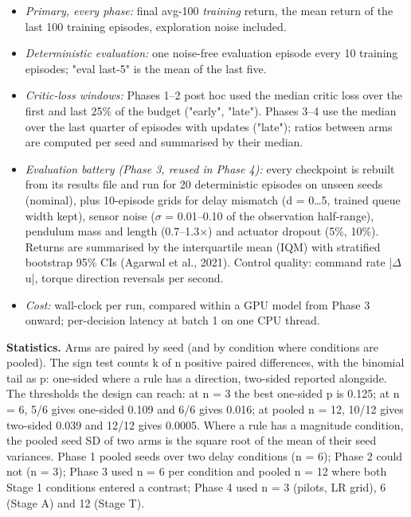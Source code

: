 \documentclass[11pt]{article}
\begin{document}
\begin{itemize}
\item \emph{Primary, every phase:} final avg-100 \emph{training} return, the mean return of the last 100 training episodes, exploration noise included.
\item \emph{Deterministic evaluation:} one noise-free evaluation episode every 10 training episodes; "eval last-5" is the mean of the last five.
\item \emph{Critic-loss windows:} Phases 1--2 post hoc used the median critic loss over the first and last 25\% of the budget ("early", "late"). Phases 3--4 use the median over the last quarter of episodes with updates ("late"); ratios between arms are computed per seed and summarised by their median.
\item \emph{Evaluation battery (Phase 3, reused in Phase 4):} every checkpoint is rebuilt from its results file and run for 20 deterministic episodes on unseen seeds (nominal), plus 10-episode grids for delay mismatch (d = 0\ldots{}5, trained queue width kept), sensor noise ($\sigma$ = 0.01--0.10 of the observation half-range), pendulum mass and length (0.7--1.3$\times$) and actuator dropout (5\%, 10\%). Returns are summarised by the interquartile mean (IQM) with stratified bootstrap 95\% CIs (Agarwal et al., 2021). Control quality: command rate |$\Delta$u|, torque direction reversals per second.
\item \emph{Cost:} wall-clock per run, compared within a GPU model from Phase 3 onward; per-decision latency at batch 1 on one CPU thread.
\end{itemize}



\textbf{Statistics.} Arms are paired by seed (and by condition where conditions are pooled). The sign test counts k of n positive paired differences, with the binomial tail as p: one-sided where a rule has a direction, two-sided reported alongside. The thresholds the design can reach: at n = 3 the best one-sided p is 0.125; at n = 6, 5/6 gives one-sided 0.109 and 6/6 gives 0.016; at pooled n = 12, 10/12 gives two-sided 0.039 and 12/12 gives 0.0005. Where a rule has a magnitude condition, the pooled seed SD of two arms is the square root of the mean of their seed variances. Phase 1 pooled seeds over two delay conditions (n = 6); Phase 2 could not (n = 3); Phase 3 used n = 6 per condition and pooled n = 12 where both Stage 1 conditions entered a contrast; Phase 4 used n = 3 (pilots, LR grid), 6 (Stage A) and 12 (Stage T).
\end{document}
